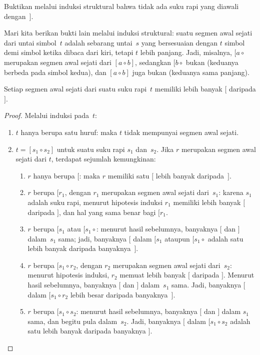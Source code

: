 \documentclass[../../../include/open-logic-section]{subfiles}
\begin{document}
\begin{prob}
  Buktikan melalui induksi struktural bahwa tidak ada suku rapi yang diawali
  dengan~$]$.
\end{prob}

Mari kita berikan bukti lain melalui induksi struktural: suatu segmen awal
sejati dari untai simbol~$t$ adalah sebarang untai~$s$ yang bersesuaian
dengan $t$ simbol demi simbol ketika dibaca dari kiri, tetapi $t$ lebih
panjang. Jadi, misalnya, $[a \circ {}$ merupakan segmen awal sejati dari
$[a \circ b]$, sedangkan $[b \circ {}$ bukan (keduanya berbeda pada simbol
kedua), dan $[a \circ b]$ juga bukan (keduanya sama panjang).

\begin{prop}
  Setiap segmen awal sejati dari suatu suku rapi~$t$ memiliki lebih banyak
  $[$ daripada $]$.
\end{prop}

\begin{proof}
  Melalui induksi pada~$t$:
  \begin{enumerate}
  \item $t$ hanya berupa satu huruf: maka $t$ tidak mempunyai segmen awal
    sejati.
  \item $t = [s_1 \circ s_2]$ untuk suatu suku rapi $s_1$ dan~$s_2$. Jika
    $r$ merupakan segmen awal sejati dari $t$, terdapat sejumlah
    kemungkinan:
    \begin{enumerate}
    \item $r$ hanya berupa $[$: maka $r$ memiliki satu $[$ lebih banyak
      daripada~$]$.
    \item $r$ berupa $[r_1$, dengan $r_1$ merupakan segmen awal sejati
      dari~$s_1$: karena $s_1$ adalah suku rapi, menurut hipotesis induksi
      $r_1$ memiliki lebih banyak $[$ daripada $]$, dan hal yang sama benar
      bagi $[r_1$.
    \item $r$ berupa $[s_1$ atau $[s_1 \circ {}$: menurut hasil sebelumnya,
      banyaknya $[$ dan $]$ dalam~$s_1$ sama; jadi, banyaknya $[$ dalam
      $[s_1$ ataupun $[s_1 \circ {}$ adalah satu lebih banyak daripada
      banyaknya~$]$.
    \item $r$ berupa $[s_1 \circ r_2$, dengan $r_2$ merupakan segmen awal
      sejati dari~$s_2$: menurut hipotesis induksi, $r_2$ memuat lebih
      banyak $[$ daripada $]$. Menurut hasil sebelumnya, banyaknya $[$ dan
      $]$ dalam~$s_1$ sama. Jadi, banyaknya $[$ dalam $[s_1 \circ r_2$
      lebih besar daripada banyaknya~$]$.
    \item $r$ berupa $[s_1 \circ s_2$: menurut hasil sebelumnya, banyaknya
      $[$ dan $]$ dalam $s_1$ sama, dan begitu pula dalam~$s_2$. Jadi,
      banyaknya $[$ dalam $[s_1 \circ s_2$ adalah satu lebih banyak daripada
      banyaknya $]$.
    \end{enumerate}
  \end{enumerate}
\end{proof}
\end{document}
